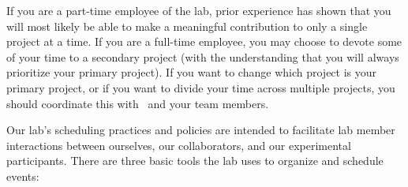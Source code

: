 \documentclass{tufte-book} %
\begin{document}
If you are a part-time employee of the lab, prior experience has shown
that you will most likely be able to make a meaningful contribution to
only a single project at a time.  If you are a full-time employee, you
may choose to devote some of your time to a secondary project (with
the understanding that you will always prioritize your primary
project).  If you want to change which project is your primary
project, or if you want to divide your time across multiple projects,
you should coordinate this with \director~and your team members.


\label{sec: scheduling}

\noindent Our lab's scheduling practices and
policies are intended to facilitate lab member interactions between
ourselves, our collaborators, and our experimental participants.
There are three basic tools the lab uses to organize and schedule
events:
\end{document}
